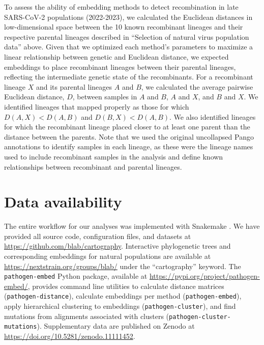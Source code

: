 \documentclass[webpdf,contemporary,large,single]{oup-authoring-template}%
\theoremstyle{thmstyleone}%
\theoremstyle{thmstyletwo}%
\theoremstyle{thmstylethree}%
\begin{document}
To assess the ability of embedding methods to detect recombination in late SARS-CoV-2 populations (2022-2023), we calculated the Euclidean distances in low-dimensional space between the 10 known recombinant lineages and their respective parental lineages described in ``Selection of natural virus population data'' above.
Given that we optimized each method's parameters to maximize a linear relationship between genetic and Euclidean distance, we expected embeddings to place recombinant lineages between their parental lineages, reflecting the intermediate genetic state of the recombinants.
For a recombinant lineage $X$ and its parental lineages $A$ and $B$, we calculated the average pairwise Euclidean distance, $D$, between samples in $A$ and $B$, $A$ and $X$, and $B$ and $X$.
We identified lineages that mapped properly as those for which $D(A, X) < D(A, B)$ and $D(B, X) < D(A, B)$.
We also identified lineages for which the recombinant lineage placed closer to at least one parent than the distance between the parents.
Note that we used the original uncollapsed Pango annotations to identify samples in each lineage, as these were the lineage names used to include recombinant samples in the analysis and define known relationships between recombinant and parental lineages.

\section*{Data availability}

The entire workflow for our analyses was implemented with Snakemake \citep{molder_2021}.
We have provided all source code, configuration files, and datasets at \href{https://github.com/blab/cartography}{https://github.com/blab/cartography}.
Interactive phylogenetic trees and corresponding embeddings for natural populations are available at \href{https://nextstrain.org/groups/blab/}{https://nextstrain.org/groups/blab/} under the ``cartography'' keyword.
The \texttt{pathogen-embed} Python package, available at \href{https://pypi.org/project/pathogen-embed/}{https://pypi.org/project/pathogen-embed/}, provides command line utilities to calculate distance matrices (\texttt{pathogen-distance}), calculate embeddings per method (\texttt{pathogen-embed}), apply hierarchical clustering to embeddings (\texttt{pathogen-cluster}), and find mutations from alignments associated with clusters (\texttt{pathogen-cluster-mutations}).
Supplementary data are published on Zenodo at \url{https://doi.org/10.5281/zenodo.11111452}.
\end{document}
